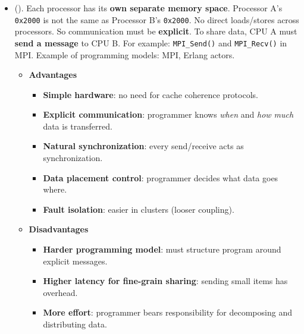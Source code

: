 \begin{itemize}
    \item {} (). Each processor has its \textbf{own separate memory space}. Processor A's \texttt{0x2000} is not the same as Processor B's \texttt{0x2000}. No direct loads/stores across processors. So communication must be \textbf{explicit}. To share data, CPU A must \textbf{send a message} to CPU B. For example: \texttt{MPI\_Send()} and \texttt{MPI\_Recv()} in MPI. Example of programming models: MPI, Erlang actors.

    \begin{itemize}
        \item[\textcolor{Green3}{\faIcon{check-circle}}] \textcolor{Green3}{\textbf{Advantages}}
        \begin{itemize}
            \item[\textcolor{Green3}{\faIcon{check}}] \textcolor{Green3}{\textbf{Simple hardware}}: no need for cache coherence protocols.
            \item[\textcolor{Green3}{\faIcon{check}}] \textcolor{Green3}{\textbf{Explicit communication}}: programmer knows \emph{when} and \emph{how much} data is transferred.
            \item[\textcolor{Green3}{\faIcon{check}}] \textcolor{Green3}{\textbf{Natural synchronization}}: every send/receive acts as synchronization.
            \item[\textcolor{Green3}{\faIcon{check}}] \textcolor{Green3}{\textbf{Data placement control}}: programmer decides what data goes where.
            \item[\textcolor{Green3}{\faIcon{check}}] \textcolor{Green3}{\textbf{Fault isolation}}: easier in clusters (looser coupling).
        \end{itemize}
        \item[\textcolor{Red2}{\faIcon{times-circle}}] \textcolor{Red2}{\textbf{Disadvantages}}
        \begin{itemize}
            \item[\textcolor{Red2}{\faIcon{times}}] \textcolor{Red2}{\textbf{Harder programming model}}: must structure program around explicit messages.
            \item[\textcolor{Red2}{\faIcon{times}}] \textcolor{Red2}{\textbf{Higher latency for fine-grain sharing}}: sending small items has overhead.
            \item[\textcolor{Red2}{\faIcon{times}}] \textcolor{Red2}{\textbf{More effort}}: programmer bears responsibility for decomposing and distributing data.
        \end{itemize}
    \end{itemize}
\end{itemize}
